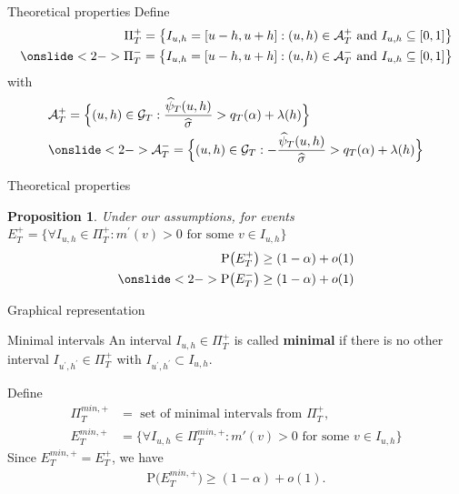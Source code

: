 \documentclass[10pt]{beamer}
\newcommand{\Prob}{\mathrm{P}}
\newtheorem{prop}{Proposition}
\begin{document}
\begin{frame}{Theoretical properties}
Define
\begin{align*}
\Pi_T^+ = \big\{ I_{u,h} = [u-h,u+h]: (u,h) \in \mathcal{A}_T^+ \text{ and } I_{u, h} \subseteq [0,1] \big\}\\
\onslide<2->{\Pi_T^- = \big\{ I_{u,h} = [u-h,u+h]: (u,h) \in \mathcal{A}_T^- \text{ and } I_{u, h} \subseteq [0,1] \big\}}
\end{align*}
\vspace{-5mm}
with
\begin{align*} 
&\mathcal{A}_T^+ = \Big\{ (u,h) \in \mathcal{G}_T: \frac{\widehat{\psi}_T(u,h)}{\widehat{\sigma}} > q_T(\alpha)  + \lambda(h)  \Big\}\\
&\onslide<2->{\mathcal{A}_T^- = \Big\{ (u,h) \in \mathcal{G}_T: -\frac{\widehat{\psi}_T(u,h)}{\widehat{\sigma}} > q_T(\alpha)  + \lambda(h)  \Big\}}
\end{align*}
\end{frame}

\begin{frame}{Theoretical properties}
\begin{prop}\label{prop-shape-3}
Under our assumptions, for events $E_T^+ = \Big\{ \forall I_{u,h} \in \Pi_T^+: m^{\prime}(v) > 0 \text{ for some } v \in I_{u,h}\Big\}$
\begin{align*}
\Prob \big( E_T^+ \big) \ge (1-\alpha) + o(1)\\
\onslide<2->{\Prob \big( E_T^- \big) \ge (1-\alpha) + o(1)}
\end{align*} 
\end{prop}
\end{frame}

\begin{frame}{Graphical representation}
\begin{block}{Minimal intervals}
An interval $I_{u, h} \in \Pi^+_T$ is called \textbf{minimal} if there is no other interval $I_{u^\prime, h^\prime} \in \Pi^+_T$ with $I_{u^\prime, h^\prime} \subset I_{u, h}$.
\end{block}\pause
Define
\begin{align*}
\Pi^{min, +}_T &= \text{ set of minimal intervals from }\Pi^+_T,\\
E_T^{min, +} &= \Big\{ \forall I_{u,h} \in \Pi_T^{min, +}: m'(v) > 0 \text{ for some } v \in I_{u,h}\Big\}
\end{align*}\pause
Since $E_T^{min, +} = E_T^{+}$, we have
\begin{align*}
\Prob \big( E_T^{min, +} \big) \ge (1-\alpha) + o(1).
\end{align*}
\end{frame}
\end{document}

